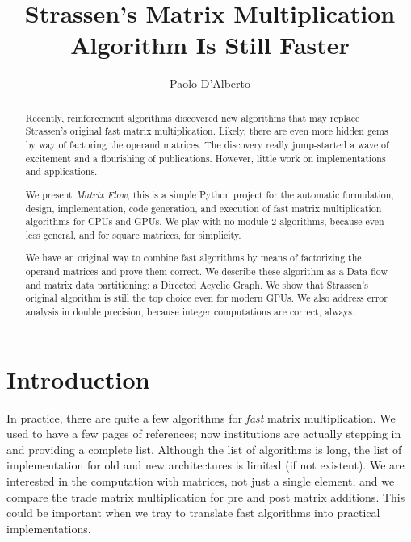 \documentclass[acmsmall]{acmart}
\begin{document}
\title{Strassen's Matrix Multiplication Algorithm Is Still Faster}

\author{Paolo D'Alberto}
\email{}

\renewcommand{\shortauthors}{D'Alberto et al.}

\begin{abstract}
  Recently, reinforcement algorithms discovered new algorithms that
  may replace Strassen's original fast matrix multiplication. Likely,
  there are even more hidden gems by way of factoring the operand
  matrices. The discovery really jump-started a wave of excitement and
  a flourishing of publications. However, little work on
  implementations and applications.

  We present {\em Matrix Flow}, this is a simple Python project for
  the automatic formulation, design, implementation, code generation,
  and execution of fast matrix multiplication algorithms for CPUs and
  GPUs. We play with no module-2 algorithms, because even less
  general, and for square matrices, for simplicity.

  We have an original way to combine fast algorithms by means of
  factorizing the operand matrices and prove them correct. We describe
  these algorithm as a Data flow and matrix data partitioning: a
  Directed Acyclic Graph. We show that Strassen's original algorithm
  is still the top choice even for modern GPUs. We also address error
  analysis in double precision, because integer computations are
  correct, always.
\end{abstract}

\maketitle

\section{Introduction} 
\label{sec:introduction}
In practice, there are quite a few algorithms for {\em fast} matrix
multiplication. We used to have a few pages of references; now
institutions are actually stepping in and providing a complete
list. Although the list of algorithms is long, the list of
implementation for old and new architectures is limited (if not
existent). We are interested in the computation with matrices, not
just a single element, and we compare the trade matrix multiplication
for pre and post matrix additions. This could be important when we
tray to translate fast algorithms into practical implementations.
\end{document}
